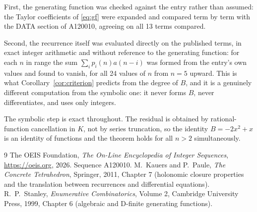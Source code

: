 \documentclass[11pt,a4paper]{article}
\theoremstyle{plain}
\theoremstyle{definition}
\begin{document}
First, the generating function was checked against the entry rather than assumed: the
Taylor coefficients of \eqref{eq:gf} were expanded and compared term by term with the DATA
section of A120010, agreeing on all 13 terms compared.

Second, the recurrence itself was evaluated directly on the published terms, in exact
integer arithmetic and without reference to the generating function: for each $n$ in range
the sum $\sum_{i}p_{i}(n)a(n-i)$ was formed from the entry's own values and found to
vanish, for all 24 values of $n$ from $n=5$ upward. This is what
Corollary~\ref{cor:criterion} predicts from the degree of $B$, and it is a genuinely
different computation from the symbolic one: it never forms $B$, never differentiates, and
uses only integers.

The symbolic step is exact throughout. The residual is obtained by rational-function
cancellation in $K$, not by series truncation, so the identity $B=- 2 x^{2} + x$ is an
identity of functions and the theorem holds for all $n>2$ simultaneously.

\begin{thebibliography}{9}
 The OEIS Foundation, \emph{The On-Line Encyclopedia of Integer Sequences},
\url{https://oeis.org}, 2026. Sequence A120010.
 M.~Kauers and P.~Paule, \emph{The Concrete Tetrahedron}, Springer, 2011,
Chapter 7 (holonomic closure properties and the translation between recurrences and
differential equations).
 R.~P.~Stanley, \emph{Enumerative Combinatorics}, Volume 2, Cambridge
University Press, 1999, Chapter 6 (algebraic and D-finite generating functions).
\end{thebibliography}
\end{document}
